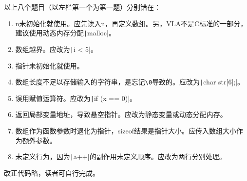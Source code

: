 \begin{answer}
以上八个题目（以左栏第一个为第一题）分别错在：
\begin{enumerate}
    \item n未初始化就使用。应先读入n，再定义数组。另，VLA不是C标准的一部分，建议使用动态内存分配\texttt|malloc|。
    \item 数组越界。应改为\texttt|i < 5|。
    \item 指针未初始化就使用。
    \item 数组长度不足以存储输入的字符串，是忘记\verb|\0|导致的。应改为\texttt|char str[6];|。
    \item 误用赋值运算符。应改为\texttt|if (x == 0)|。
    \item 返回局部变量地址，导致悬空指针。应改为静态变量或动态分配内存。
    \item 数组作为函数参数时退化为指针，sizeof结果是指针大小。应传入数组大小作为额外参数。
    \item 未定义行为，因为\texttt|a++|的副作用未定义顺序。应改为两行分别处理。
\end{enumerate}
改正代码略，读者可自行完成。
\end{answer}
